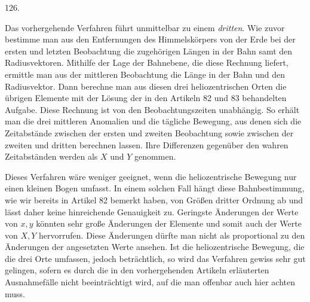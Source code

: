 \par{}\medskip
\begin{center}\hypertarget{native-173-article126}{}126.\end{center}
Das vorhergehende Verfahren führt unmittelbar zu einem \emph{dritten}. Wie zuvor bestimme man aus den Entfernungen des Himmelskörpers von der Erde bei der ersten und letzten Beobachtung die zugehörigen Längen in der Bahn samt den Radiusvektoren. Mithilfe der Lage der Bahnebene, die diese Rechnung liefert, ermittle man aus der mittleren Beobachtung die Länge in der Bahn und den Radiusvektor. Dann berechne man aus diesen drei heliozentrischen Orten die übrigen Elemente mit der Lösung der in den Artikeln 82 und 83 behandelten Aufgabe. Diese Rechnung ist von den Beobachtungszeiten unabhängig. So erhält man die drei mittleren Anomalien und die tägliche Bewegung, aus denen sich die Zeitabstände zwischen der ersten und zweiten Beobachtung sowie zwischen der zweiten und dritten berechnen lassen. Ihre Differenzen gegenüber den wahren Zeitabständen werden als $X$ und $Y$ genommen.

Dieses Verfahren wäre weniger geeignet, wenn die heliozentrische Bewegung nur einen kleinen Bogen umfasst. In einem solchen Fall hängt diese Bahnbestimmung, wie wir bereits in Artikel 82 bemerkt haben, von Größen dritter Ordnung ab und lässt daher keine hinreichende Genauigkeit zu. Geringste Änderungen der Werte von $x,y$ könnten sehr große Änderungen der Elemente und somit auch der Werte von $X,Y$ hervorrufen. Diese Änderungen dürfte man nicht als proportional zu den Änderungen der angesetzten Werte ansehen. Ist die heliozentrische Bewegung, die die drei Orte umfassen, jedoch beträchtlich, so wird das Verfahren gewiss sehr gut gelingen, sofern es durch die in den vorhergehenden Artikeln erläuterten Ausnahmefälle nicht beeinträchtigt wird, auf die man offenbar auch hier achten muss.
